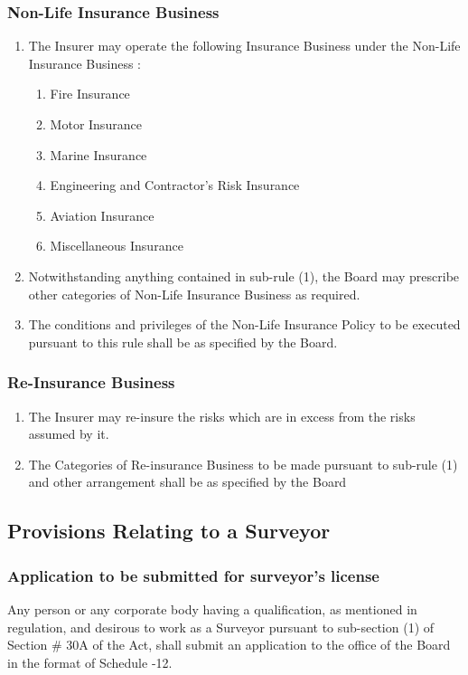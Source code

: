 \subsubsection{Non-Life Insurance Business}
\begin{enumerate}
	\item The Insurer may operate the following Insurance Business under the Non-Life Insurance Business :
	\begin{enumerate}
		\item Fire Insurance
		\item Motor Insurance
		\item Marine Insurance
		\item Engineering and Contractor's Risk Insurance
		\item Aviation Insurance
		\item Miscellaneous Insurance
	\end{enumerate}
	\item Notwithstanding anything contained in sub-rule (1), the Board may prescribe other categories of Non-Life Insurance Business as required.
	\item The conditions and privileges of the Non-Life Insurance Policy to be executed pursuant to this rule shall be as specified by the Board.

\end{enumerate}
%
\subsubsection{Re-Insurance Business}
\begin{enumerate}
	\item The Insurer may re-insure the risks which are in excess from the risks assumed by it.
	\item The Categories of Re-insurance Business to be made pursuant to sub-rule (1) and other arrangement shall be as specified by the Board
\end{enumerate}
%
\subsection{Provisions Relating to a Surveyor}
\subsubsection{Application to be submitted for surveyor's license}
Any person or any corporate body having a qualification, as mentioned in regulation, and desirous to work as a Surveyor pursuant to sub-section (1) of Section \# 30A of the Act, shall submit an application to the office of the Board in the format of Schedule -12.
%
